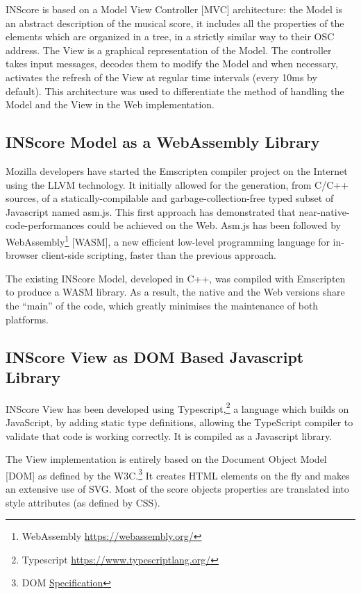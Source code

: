 \documentclass{article}
\begin{document}
INScore is based on a Model View Controller [MVC] architecture: the Model is an abstract description of the musical score, it includes all the properties of the elements which are organized in a tree, in a strictly similar way to their OSC address. The View is a graphical representation of the Model.
The controller takes input messages, decodes them to modify the Model and when necessary, activates the refresh of the View at regular time intervals (every 10ms by default).
This architecture was used to differentiate the method of handling the Model and the View in the Web implementation.

\subsection{INScore Model as a WebAssembly Library}

Mozilla developers have started the Emscripten compiler project \cite{10.1145/2048147.2048224} on the Internet using the LLVM technology. It initially allowed for the generation, from C/C++ sources, of a statically-compilable and garbage-collection-free typed subset of Javascript named asm.js. This first approach has demonstrated that near-native-code-performances could be achieved on the Web. Asm.js has been followed by WebAssembly\footnote{WebAssembly \url{https://webassembly.org/}} [WASM], a new efficient low-level programming language for in-browser client-side scripting, faster than the previous approach.

The existing INScore Model, developed in C++, was compiled with Emscripten to produce a WASM library. 
As a result, the native and the Web versions share the ``main'' of the code, which greatly minimises the maintenance of both platforms.

\subsection{INScore View as DOM Based Javascript Library}

INScore View has been developed using Typescript,\footnote{Typescript \url{https://www.typescriptlang.org/}} a language which builds on JavaScript, by adding static type definitions, allowing the TypeScript compiler to validate that code is working correctly. It is compiled as a Javascript library.

The View implementation is entirely based on the Document Object Model [DOM] as defined by the W3C.\footnote{DOM \href{https://www.w3.org/TR/2000/WD-DOM-Level-1-20000929/DOM.pdf}{Specification}} It creates HTML elements on the fly and makes an extensive use of SVG. Most of the score objects properties are translated into style attributes (as defined by CSS).
\end{document}
